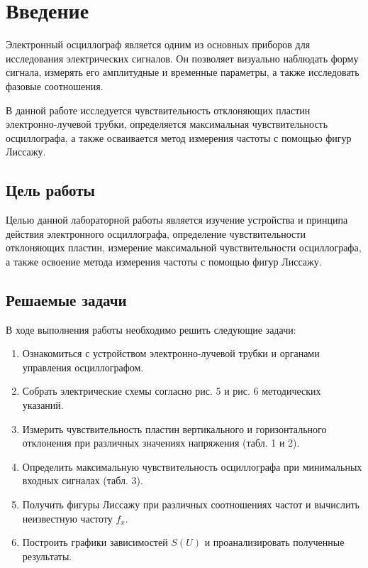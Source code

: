 \section{Введение}

Электронный осциллограф является одним из основных приборов для исследования электрических сигналов. Он позволяет визуально наблюдать форму сигнала, измерять его амплитудные и временные параметры, а также исследовать фазовые соотношения.

В данной работе исследуется чувствительность отклоняющих пластин электронно-лучевой трубки, определяется максимальная чувствительность осциллографа, а также осваивается метод измерения частоты с помощью фигур Лиссажу.


\subsection{Цель работы}

Целью данной лабораторной работы является изучение устройства и принципа действия электронного осциллографа, определение чувствительности отклоняющих пластин, измерение максимальной чувствительности осциллографа, а также освоение метода измерения частоты с помощью фигур Лиссажу.

\subsection{Решаемые задачи}

В ходе выполнения работы необходимо решить следующие задачи:
\begin{enumerate}
    \item Ознакомиться с устройством электронно-лучевой трубки и органами управления осциллографом.
    \item Собрать электрические схемы согласно рис. 5 и рис. 6 методических указаний.
    \item Измерить чувствительность пластин вертикального и горизонтального отклонения при различных значениях напряжения (табл. 1 и 2).
    \item Определить максимальную чувствительность осциллографа при минимальных входных сигналах (табл. 3).
    \item Получить фигуры Лиссажу при различных соотношениях частот и вычислить неизвестную частоту \(f_x\).
    \item Построить графики зависимостей \(S(U)\) и проанализировать полученные результаты.
\end{enumerate}


